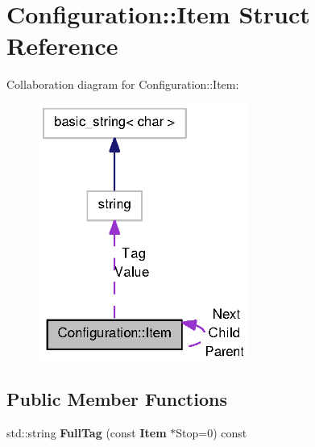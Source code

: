 \section{\-Configuration\-:\-:\-Item \-Struct \-Reference}
\label{structConfiguration_1_1Item}


\-Collaboration diagram for \-Configuration\-:\-:\-Item\-:
\nopagebreak
\begin{figure}[H]
\begin{center}
\leavevmode
\includegraphics[width=194pt]{structConfiguration_1_1Item__coll__graph}
\end{center}
\end{figure}
\subsection*{\-Public \-Member \-Functions}
\begin{DoxyCompactItemize}
\item 
std\-::string {\bfseries \-Full\-Tag} (const {\bf \-Item} $\ast$\-Stop=0) const \label{structConfiguration_1_1Item_ad23cbb1943e578ce9a05a57d79a39a16}

\end{DoxyCompactItemize}
